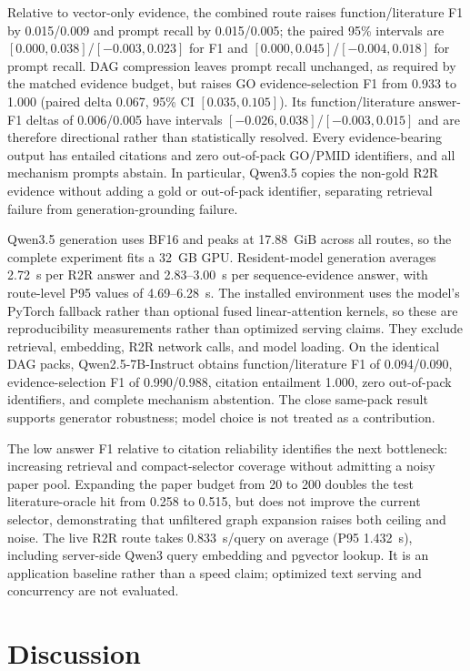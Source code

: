 \documentclass[11pt]{article}
\begin{document}
Relative to vector-only evidence, the combined route raises function/literature F1 by 0.015/0.009 and prompt recall by 0.015/0.005; the paired 95\% intervals are $[0.000,0.038]$/$[-0.003,0.023]$ for F1 and $[0.000,0.045]$/$[-0.004,0.018]$ for prompt recall. DAG compression leaves prompt recall unchanged, as required by the matched evidence budget, but raises GO evidence-selection F1 from 0.933 to 1.000 (paired delta 0.067, 95\% CI $[0.035,0.105]$). Its function/literature answer-F1 deltas of 0.006/0.005 have intervals $[-0.026,0.038]$/$[-0.003,0.015]$ and are therefore directional rather than statistically resolved. Every evidence-bearing output has entailed citations and zero out-of-pack GO/PMID identifiers, and all mechanism prompts abstain. In particular, Qwen3.5 copies the non-gold R2R evidence without adding a gold or out-of-pack identifier, separating retrieval failure from generation-grounding failure.

Qwen3.5 generation uses BF16 and peaks at 17.88~GiB across all routes, so the complete experiment fits a 32~GB GPU. Resident-model generation averages 2.72~s per R2R answer and 2.83--3.00~s per sequence-evidence answer, with route-level P95 values of 4.69--6.28~s. The installed environment uses the model's PyTorch fallback rather than optional fused linear-attention kernels, so these are reproducibility measurements rather than optimized serving claims. They exclude retrieval, embedding, R2R network calls, and model loading. On the identical DAG packs, Qwen2.5-7B-Instruct obtains function/literature F1 of 0.094/0.090, evidence-selection F1 of 0.990/0.988, citation entailment 1.000, zero out-of-pack identifiers, and complete mechanism abstention. The close same-pack result supports generator robustness; model choice is not treated as a contribution.

The low answer F1 relative to citation reliability identifies the next bottleneck: increasing retrieval and compact-selector coverage without admitting a noisy paper pool. Expanding the paper budget from 20 to 200 doubles the test literature-oracle hit from 0.258 to 0.515, but does not improve the current selector, demonstrating that unfiltered graph expansion raises both ceiling and noise. The live R2R route takes 0.833~s/query on average (P95 1.432~s), including server-side Qwen3 query embedding and pgvector lookup. It is an application baseline rather than a speed claim; optimized text serving and concurrency are not evaluated.

\FloatBarrier
\section{Discussion}
\end{document}
